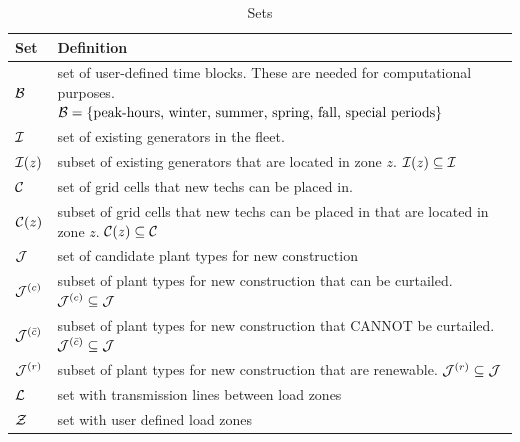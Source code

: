 \documentclass[11pt, oneside]{article}   	%
\newcommand{\bc}{\bar{c}}
\begin{document}
\begin{table}[H]
   \centering
   \caption{Sets}
   \begin{tabular}{p{1in} p{4in} } %
      \toprule
      \textbf{Set} & \textbf{Definition} \\
      \midrule
      $\mathcal{B}$ & set of user-defined time blocks. These are needed for computational purposes. $\mathcal{B} = \{\text{peak-hours, winter, summer, spring, fall, special periods}\}$ \\
      $\mathcal{I}$ & set of existing generators in the fleet. \\
      $\mathcal{I} (z)$ & subset of existing generators that are located in zone $z$.  $\mathcal{I} (z) \subseteq \mathcal{I}$\\
      $\mathcal{C}$ & set of grid cells that new techs can be placed in. \\
      $\mathcal{C} (z)$ & subset of grid cells that new techs can be placed in that are located in zone $z$. $\mathcal{C} (z) \subseteq \mathcal{C}$\\
      $\mathcal{J}$ & set of candidate plant types for new construction \\
      $\mathcal{J}^{(c)}$ & subset of plant types for new construction that can be curtailed. $\mathcal{J}^{(c)} \subseteq \mathcal{J}$\\
      $\Jc^{(\bc)}$ & subset of plant types for new construction that CANNOT be curtailed. $\Jc^{(\bc)} \subseteq \Jc$\\
      $\mathcal{J}^{(r)}$ & subset of plant types for new construction that are renewable. $\mathcal{J}^{(r)} \subseteq \mathcal{J}$\\
      $\mathcal{L}$ & set with transmission lines between load zones \\
      $\mathcal{Z}$ & set with user defined load zones \\
      \bottomrule
   \end{tabular}
   \label{tab:sets}
\end{table}
\end{document}

